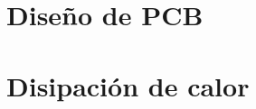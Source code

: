 \section{Diseño de PCB}
\resetallcounters

\clearpage


\section{Disipación de calor}
\resetallcounters

\clearpage



